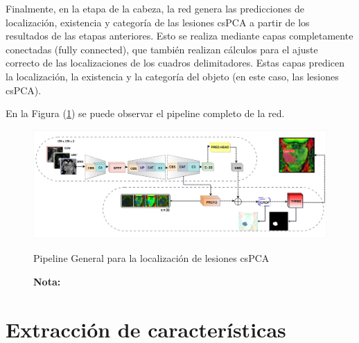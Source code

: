 Finalmente, en la etapa de la cabeza, la red genera las predicciones de localización, existencia y categoría de las lesiones csPCA a partir de los resultados de las etapas anteriores. Esto se realiza mediante capas completamente conectadas (fully connected), que también realizan cálculos para el ajuste correcto de las localizaciones de los cuadros delimitadores. Estas capas predicen la localización, la existencia y la categoría del objeto (en este caso, las lesiones csPCA).

En la Figura (\ref{fig:pipeline}) se puede observar el pipeline completo de la red.



\begin{figure}[h!]
	\centering
	\caption{Pipeline General para la localización de lesiones csPCA}
	\includegraphics[width=1\textwidth]{imgs/pip_2.png}
	\label{fig:pipeline}
\end{figure}

\begin{figure}[h!]
	\noindent \textbf{Nota:} 
\end{figure}


\section{Extracción de características}





